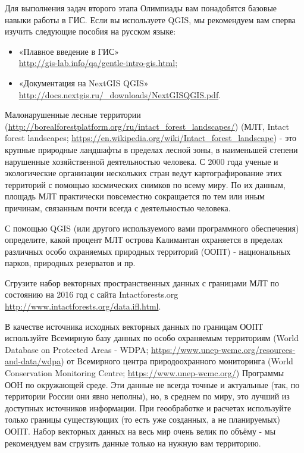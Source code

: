 
Для выполнения задач второго этапа Олимпиады вам понадобятся базовые навыки работы в ГИС. Если вы используете QGIS, мы рекомендуем вам сперва изучить следующие пособия на русском языке:

\begin{itemize}
    \item «Плавное введение в ГИС»\\ \url{http://gis-lab.info/qa/gentle-intro-gis.html};
    \item «Документация на NextGIS QGIS» \\ \url{http://docs.nextgis.ru/_downloads/NextGISQGIS.pdf}.
\end{itemize}

Малонарушенные лесные территории (\url{http://borealforestplatform.org/ru/intact_forest_landscapes/}) (МЛТ, Intact forest landscapes; \url{https://en.wikipedia.org/wiki/Intact_forest_landscape}) - это крупные природные ландшафты в 
пределах лесной зоны, в наименьшей степени нарушенные хозяйственной деятельностью человека. С 2000 года ученые и экологические организации нескольких стран ведут картографирование этих территорий с помощью космических снимков по всему миру. По их данным, площадь МЛТ практически повсеместно сокращается по тем или иным причинам, связанным почти всегда с деятельностью человека. 

С помощью QGIS (или другого используемого вами программного обеспечения) определите, какой процент МЛТ острова Калимантан охраняется в пределах различных особо охраняемых природных территорий (ООПТ) - национальных парков, природных резерватов и пр.

Сгрузите набор векторных пространственных данных с границами МЛТ по состоянию на 2016 год с сайта 
Intactforests.org \url{http://www.intactforests.org/data.ifl.html}.

В качестве источника исходных векторных данных по границам ООПТ используйте Всемирную базу 
данных по особо охраняемым территориям (World Database on Protected Areas - WDPA; \url{https://www.unep-wcmc.org/resources-and-data/wdpa}) 
от Всемирного центра природоохранного мониторинга (World Conservation Monitoring Centre; \url{https://www.unep-wcmc.org/}) Программы ООН по окружающей среде. Эти данные не всегда точные и актуальные (так, по территории России они явно неполны), но, в среднем по миру, это лучший из доступных источников информации. При геообработке и расчетах используйте только границы существующих (то есть уже созданных, а не планируемых) ООПТ. Набор векторных данных на весь мир очень велик по объёму - мы рекомендуем вам сгрузить данные только на нужную вам территорию.

